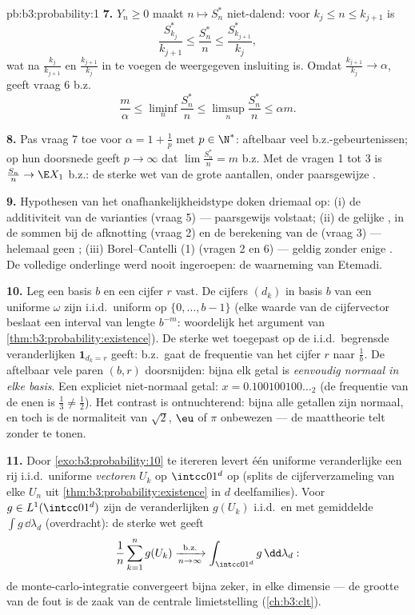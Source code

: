 \begin{solution}{pb:b3:probability:1}
\textbf{7.} $Y_n \geq 0$ maakt $n \mapsto S^*_n$ niet-dalend:
voor $k_j \leq n \leq k_{j+1}$ is
\[
\frac{S^*_{k_j}}{k_{j+1}} \leq \frac{S^*_n}{n} \leq
\frac{S^*_{k_{j+1}}}{k_j},
\]
wat na $\frac{k_j}{k_{j+1}}$ en $\frac{k_{j+1}}{k_j}$ in te
voegen de weergegeven insluiting is. Omdat
$\frac{k_{j+1}}{k_j} \to \alpha$, geeft vraag 6 b.z.
\[
\frac m\alpha \leq \liminf_n\frac{S^*_n}n \leq
\limsup_n\frac{S^*_n}n \leq \alpha m .
\]

\textbf{8.} Pas vraag 7 toe voor $\alpha = 1 + \frac1p$ met $p
\in \N^*$: aftelbaar veel b.z.-gebeurtenissen; op hun doorsnede
geeft $p \to \infty$ dat $\lim\frac{S^*_n}n = m$ b.z. Met de
vragen 1 tot 3 is $\frac{S_n}n \to \E X_1$ b.z.: de sterke wet
van de grote aantallen, onder paarsgewijze .

\textbf{9.} Hypothesen van het onafhankelijkheidstype doken
driemaal op: (i) de additiviteit van de varianties (vraag 5) ---
paarsgewijs volstaat; (ii) de gelijke , in de sommen bij
de afknotting (vraag 2) en de berekening van de
 (vraag 3) --- helemaal geen ;
(iii) Borel--Cantelli (1) (vragen 2 en 6) --- geldig zonder enige
. De volledige onderlinge  werd
nooit ingeroepen: de waarneming van Etemadi.

\textbf{10.} Leg een basis $b$ en een cijfer $r$ vast. De cijfers
$(d_k)$ in basis $b$ van een uniforme $\omega$ zijn i.i.d.\
uniform op $\{0, \dots, b-1\}$ (elke waarde van de cijfervector
beslaat een interval van lengte $b^{-m}$: woordelijk het argument
van \cref{thm:b3:probability:existence}). De sterke wet toegepast
op de i.i.d.\ begrensde veranderlijken $\mathbf 1_{d_k = r}$
geeft: b.z.\ gaat de frequentie van het cijfer $r$ naar
$\frac1b$. De aftelbaar vele paren $(b, r)$ doorsnijden: bijna
elk getal is \emph{eenvoudig normaal in elke basis}. Een
expliciet niet-normaal getal: $x = 0.100100100\ldots_2$ (de
frequentie van de enen is $\frac13 \neq \frac12$). Het contrast
is ontnuchterend: bijna alle getallen zijn normaal, en toch is de
normaliteit van $\sqrt2$, $\eu$ of $\pi$ onbewezen --- de
maattheorie telt zonder te tonen.

\textbf{11.} Door \cref{exo:b3:probability:10} te itereren levert
één uniforme veranderlijke een rij i.i.d.\ uniforme
\emph{vectoren} $U_k$ op $\intcc01^d$ op (splits de
cijferverzameling van elke $U_n$ uit
\cref{thm:b3:probability:existence} in $d$ deelfamilies). Voor $g
\in L^1(\intcc01^d)$ zijn de veranderlijken $g(U_k)$ i.i.d.\ en
 met gemiddelde $\int g\,\dd\lambda_d$
(overdracht): de sterke wet geeft
\[
\frac1n\sum_{k=1}^ng(U_k)
\xrightarrow[n\to\infty]{\text{b.z.}}
\int_{\intcc01^d}g\,\dd\lambda_d :
\]
de monte-carlo-integratie convergeert bijna zeker, in elke
dimensie --- de grootte van de fout is de zaak van de centrale
limietstelling (\cref{ch:b3:clt}).


\end{solution}
